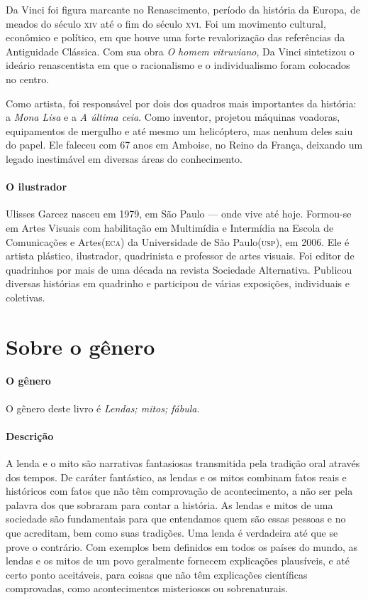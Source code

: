 \documentclass[11pt]{extarticle}
\begin{document}
Da Vinci foi figura marcante no Renascimento, período da história da Europa, de meados do século \textsc{xiv} até o fim do século  \textsc{xvi}. Foi um movimento cultural, econômico e político, em que houve uma forte revalorização das referências da Antiguidade Clássica. Com sua obra \textit{O homem vitruviano}, Da Vinci sintetizou o ideário renascentista em que o racionalismo e o individualismo foram colocados no centro.


Como artista, foi responsável por dois dos quadros mais importantes da história: a \textit{Mona Lisa} e a \textit{A última ceia}. Como inventor, projetou máquinas voadoras, equipamentos de mergulho e até mesmo um helicóptero, mas nenhum deles saiu do papel. Ele faleceu com 67 anos em Amboise, no Reino da França, deixando um legado inestimável em diversas áreas do conhecimento.

\paragraph{O ilustrador} Ulisses Garcez nasceu em 1979, em São Paulo --- onde vive até hoje. Formou-se em Artes Visuais com habilitação em Multimídia e Intermídia na Escola de Comunicações e Artes(\textsc{eca}) da Universidade de São Paulo(\textsc{usp}), em 2006. Ele é artista plástico, ilustrador, quadrinista e professor de artes visuais. Foi editor de quadrinhos por mais de uma década na revista Sociedade Alternativa. Publicou diversas histórias em quadrinho e participou de várias exposições, individuais e coletivas.


\section{Sobre o gênero}

\paragraph{O gênero} O gênero deste livro é \textit{Lendas; mitos; fábula}. 

\paragraph{Descrição} A lenda e o mito são narrativas fantasiosas transmitida pela tradição oral através dos tempos. De caráter fantástico, as lendas e os mitos combinam fatos reais e históricos com fatos que não têm comprovação de acontecimento, a não ser pela palavra dos que sobraram para contar a história. As lendas e mitos de uma sociedade são fundamentais para que entendamos quem são essas pessoas e no que acreditam, bem como suas tradições. Uma lenda é verdadeira até que se prove o contrário. Com exemplos bem definidos em todos os países do mundo, as lendas e os mitos de um povo geralmente fornecem explicações plausíveis, e até certo ponto aceitáveis, para coisas que não têm explicações científicas comprovadas, como acontecimentos misteriosos ou sobrenaturais.
\end{document}
